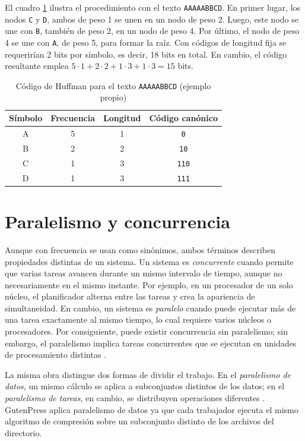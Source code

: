 \documentclass{report}
\begin{document}
El cuadro \ref{tab:ejemplo} ilustra el procedimiento con el texto \texttt{AAAAABBCD}. En primer lugar, los nodos \texttt{C} y \texttt{D}, ambos de peso 1 se unen en un nodo de peso 2. Luego, este nodo se une con \texttt{B}, también de peso 2, en un nodo de peso 4. Por último, el nodo de peso 4 se une con \texttt{A}, de peso 5, para formar la raíz. Con códigos de longitud fija se requerirían 2 bits por símbolo, es decir, 18 bits en total. En cambio, el código resultante emplea $5\cdot1 + 2\cdot2 + 1\cdot3 + 1\cdot3 = 15$ bits.

\begin{table}[ht]
    \centering
    \begin{tabular}{|c|c|c|c|}
        \hline
        \textbf{Símbolo} & \textbf{Frecuencia} & \textbf{Longitud} & \textbf{Código canónico} \\
        \hline
        A & 5 & 1 & \texttt{0} \\
        B & 2 & 2 & \texttt{10} \\
        C & 1 & 3 & \texttt{110} \\
        D & 1 & 3 & \texttt{111} \\
        \hline
    \end{tabular}
    \caption{Código de Huffman para el texto \texttt{AAAAABBCD} (ejemplo propio)}
    \label{tab:ejemplo}
\end{table}

\section{Paralelismo y concurrencia}\label{paralelismo}

Aunque con frecuencia se usan como sinónimos, ambos términos describen propiedades distintas de un sistema. Un sistema es \emph{concurrente} cuando permite que varias tareas avancen durante un mismo intervalo de tiempo, aunque no necesariamente en el mismo instante. Por ejemplo, en un procesador de un solo núcleo, el planificador alterna entre las tareas y crea la apariencia de simultaneidad. En cambio, un sistema es \emph{paralelo} cuando puede ejecutar más de una tarea exactamente al mismo tiempo, lo cual requiere varios núcleos o procesadores. Por consiguiente, puede existir concurrencia sin paralelismo; sin embargo, el paralelismo implica tareas concurrentes que se ejecutan en unidades de procesamiento distintas .

La misma obra distingue dos formas de dividir el trabajo. En el \emph{paralelismo de datos}, un mismo cálculo se aplica a subconjuntos distintos de los datos; en el \emph{paralelismo de tareas}, en cambio, se distribuyen operaciones diferentes . GutenPress aplica paralelismo de datos ya que cada trabajador ejecuta el mismo algoritmo de compresión sobre un subconjunto distinto de los archivos del directorio.
\end{document}
